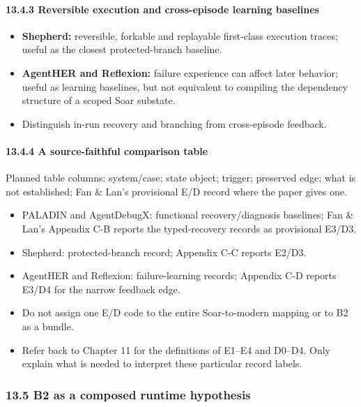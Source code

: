 \paragraph{13.4.3 Reversible execution and cross-episode learning baselines}\label{reversible-execution-and-cross-episode-learning-baselines}

\begin{itemize}
\tightlist
\item
  \textbf{Shepherd:} reversible, forkable and replayable first-class execution traces; useful as the closest protected-branch baseline.
\item
  \textbf{AgentHER and Reflexion:} failure experience can affect later behavior; useful as learning baselines, but not equivalent to compiling the dependency structure of a scoped Soar substate.
\item
  Distinguish in-run recovery and branching from cross-episode feedback.
\end{itemize}

\paragraph{13.4.4 A source-faithful comparison table}\label{a-source-faithful-comparison-table}

Planned table columns: system/case; state object; trigger; preserved edge; what is not established; Fan \& Lan's provisional E/D record where the paper gives one.

\begin{itemize}
\tightlist
\item
  PALADIN and AgentDebugX: functional recovery/diagnosis baselines; Fan \& Lan's Appendix C-B reports the typed-recovery records as provisional E3/D3.
\item
  Shepherd: protected-branch record; Appendix C-C reports E2/D3.
\item
  AgentHER and Reflexion: failure-learning records; Appendix C-D reports E3/D4 for the narrow feedback edge.
\item
  Do not assign one E/D code to the entire Soar-to-modern mapping or to B2 as a bundle.
\item
  Refer back to Chapter 11 for the definitions of E1--E4 and D0--D4. Only explain what is needed to interpret these particular record labels.
\end{itemize}

\subsubsection{13.5 B2 as a composed runtime hypothesis}\label{b2-as-a-composed-runtime-hypothesis}

